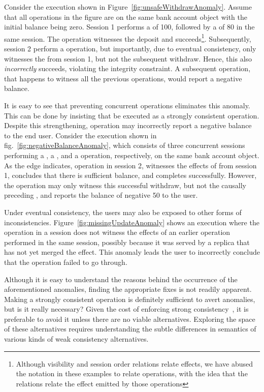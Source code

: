 Consider the execution shown in Figure~\ref{fig:unsafeWithdrawAnomaly}. Assume
that all operations in the figure are on the same bank account object with the
initial balance being zero. Session 1 performs a  of 100, followed
by a  of 80 in the same session. The  operation
witnesses the deposit and succeeds\footnote{Although visibility and session
order relations relate effects, we have abused the notation in these examples
to relate operations, with the idea that the relations relate the effect
emitted by those operations}. Subsequently, session 2 perform a 
operation, but importantly, due to eventual consistency, only witnesses the
 from session 1, but not the subsequent withdraw. Hence, this
 also \emph{incorrectly} succeeds, violating the integrity
constraint. A subsequent  operation, that happens to witness all
the previous operations, would report a negative balance.

It is easy to see that preventing concurrent  operations
eliminates this anomaly. This can be done by insisting that  be
executed as a strongly consistent operation. Despite this strengthening,
 operation may incorrectly report a negative balance to the end
user. Consider the execution shown in fig.~\ref{fig:negativeBalanceAnomaly},
which consists of three concurrent sessions performing a , a
, and a  operation, respectively, on the same bank
account object. As the  edge indicates, operation  in
session 2, witnesses the effects of  from session 1, concludes
that there is sufficient balance, and completes successfully. However, the
 operation may only witness this successful withdraw, but not
the causally preceding , and reports the balance of negative 50 to
the user.

Under eventual consistency, the users may also be exposed to other forms of
inconsistencies. Figure~\ref{fig:missingUpdateAnomaly} shows an execution where
the  operation in a session does not witness the effects of an
earlier  operation performed in the same session, possibly because
it was served by a replica that has not yet merged the  effect.
This anomaly leads the user to incorrectly conclude that the 
operation failed to go through.

Although it is easy to understand the reasons behind the occurrence of the
aforementioned anomalies, finding the appropriate fixes is not readily
apparent. Making  a strongly consistent operation is definitely
sufficient to avert anomalies, but is it really necessary? Given the cost of
enforcing strong consistency~\cite{DynamoDB,Terry2013}, it is preferable to avoid
it unless there are no viable alternatives. Exploring the space of these
alternatives requires understanding the subtle differences in semantics of
various kinds of weak consistency alternatives.

